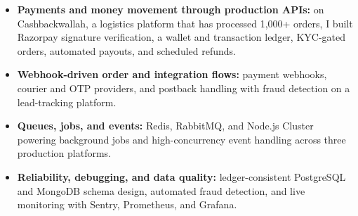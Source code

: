 \documentclass[]{cover}
\begin{document}


\currentdate{\today}




{\raggedright{}\fontsize{11pt}{13pt}\selectfont
\begin{itemize}
    \item \textbf{Payments and money movement through production APIs:} on Cashbackwallah, a logistics platform that has processed 1,000+ orders, I built Razorpay signature verification, a wallet and transaction ledger, KYC-gated orders, automated payouts, and scheduled refunds.
    \item \textbf{Webhook-driven order and integration flows:} payment webhooks, courier and OTP providers, and postback handling with fraud detection on a lead-tracking platform.
    \item \textbf{Queues, jobs, and events:} Redis, RabbitMQ, and Node.js Cluster powering background jobs and high-concurrency event handling across three production platforms.
    \item \textbf{Reliability, debugging, and data quality:} ledger-consistent PostgreSQL and MongoDB schema design, automated fraud detection, and live monitoring with Sentry, Prometheus, and Grafana.
\end{itemize}\par}
\vspace{6pt}
\end{document}
